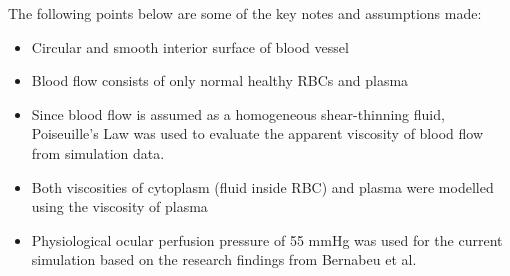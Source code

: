 \noindent The following points below are some of the key notes and assumptions made: 
\begin{itemize}
    \item Circular and smooth interior surface of blood vessel
    \item Blood flow consists of only normal healthy RBCs and plasma
    \item Since blood flow is assumed as a homogeneous shear-thinning fluid, Poiseuille's Law was used to evaluate the apparent viscosity of blood flow from simulation data. 
    \item Both viscosities of cytoplasm (fluid inside RBC) and plasma were modelled using the viscosity of plasma
    \item Physiological ocular perfusion pressure of 55 mmHg was used for the current simulation based on the research findings from Bernabeu et al.\cite{Bernabeu2014} 
\end{itemize}


